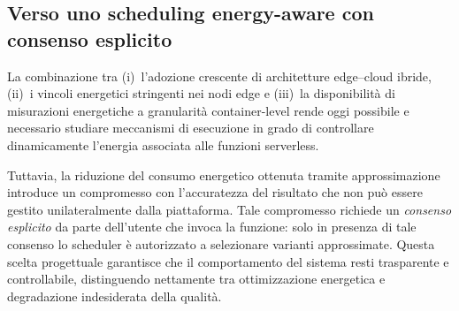 \subsection{Verso uno scheduling energy-aware con consenso esplicito}

La combinazione tra (i)~l'adozione crescente di architetture edge--cloud
ibride, (ii)~i vincoli energetici stringenti nei nodi edge e
(iii)~la disponibilità di misurazioni energetiche a granularità
container-level rende oggi possibile e necessario studiare meccanismi
di esecuzione in grado di controllare dinamicamente l'energia
associata alle funzioni serverless.

Tuttavia, la riduzione del consumo energetico ottenuta tramite
approssimazione introduce un compromesso con l'accuratezza del
risultato che non può essere gestito unilateralmente dalla piattaforma.
Tale compromesso richiede un \emph{consenso esplicito} da parte
dell'utente che invoca la funzione: solo in presenza di tale consenso
lo scheduler è autorizzato a selezionare varianti approssimate.
Questa scelta progettuale garantisce che il comportamento del sistema
resti trasparente e controllabile, distinguendo nettamente tra
ottimizzazione energetica e degradazione indesiderata della qualità.
